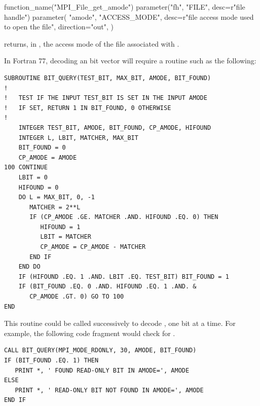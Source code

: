 %
\begin{mpi-binding}
    function_name("MPI_File_get_amode")
    parameter("fh", "FILE", desc=r"file handle")
    parameter(
        "amode",
        "ACCESS_MODE",
        desc=r"file access mode used to open the file",
        direction="out",
    )
\end{mpi-binding}

 returns, in ,
the access mode of the file associated with .

\begin{example}
\label{io-amode}
In Fortran 77, decoding an  bit vector will
require a routine such as the following:

\begin{lstlisting}[language={[MPI]Fortran}]
SUBROUTINE BIT_QUERY(TEST_BIT, MAX_BIT, AMODE, BIT_FOUND)
!
!   TEST IF THE INPUT TEST_BIT IS SET IN THE INPUT AMODE
!   IF SET, RETURN 1 IN BIT_FOUND, 0 OTHERWISE
!
    INTEGER TEST_BIT, AMODE, BIT_FOUND, CP_AMODE, HIFOUND
    INTEGER L, LBIT, MATCHER, MAX_BIT
    BIT_FOUND = 0
    CP_AMODE = AMODE
100 CONTINUE
    LBIT = 0
    HIFOUND = 0
    DO L = MAX_BIT, 0, -1
       MATCHER = 2**L
       IF (CP_AMODE .GE. MATCHER .AND. HIFOUND .EQ. 0) THEN
          HIFOUND = 1
          LBIT = MATCHER
          CP_AMODE = CP_AMODE - MATCHER
       END IF
    END DO
    IF (HIFOUND .EQ. 1 .AND. LBIT .EQ. TEST_BIT) BIT_FOUND = 1
    IF (BIT_FOUND .EQ. 0 .AND. HIFOUND .EQ. 1 .AND. &
       CP_AMODE .GT. 0) GO TO 100
END
\end{lstlisting}

This routine could be called successively to decode ,
one bit at a time.  For example, the following code fragment would
check for .

\begin{lstlisting}[language={[MPI]Fortran}]
CALL BIT_QUERY(MPI_MODE_RDONLY, 30, AMODE, BIT_FOUND)
IF (BIT_FOUND .EQ. 1) THEN
   PRINT *, ' FOUND READ-ONLY BIT IN AMODE=', AMODE
ELSE
   PRINT *, ' READ-ONLY BIT NOT FOUND IN AMODE=', AMODE
END IF
\end{lstlisting}
\end{example}

